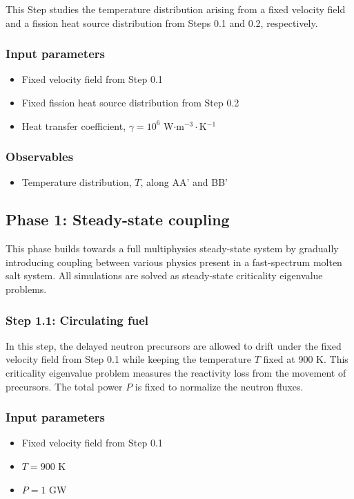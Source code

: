 This Step studies the temperature distribution arising from a fixed velocity
field and a fission heat source distribution from Steps 0.1 and 0.2,
respectively.

\subsubsection*{Input parameters}
\begin{itemize}
    \item Fixed velocity field from Step 0.1
    \item Fixed fission heat source distribution from Step 0.2
    \item Heat transfer coefficient, $\gamma = 10^6$ W$\cdot$m$^{-3}\cdot$K$^{-1}$
\end{itemize}
%
\subsubsection*{Observables}
\begin{itemize}
    \item Temperature distribution, $T$, along AA' and BB'
\end{itemize}

\subsection{Phase 1: Steady-state coupling}

This phase builds towards a full multiphysics steady-state system by gradually
introducing coupling between various physics present in
a fast-spectrum molten salt system. All simulations are solved as steady-state
criticality eigenvalue problems.

\subsubsection{Step 1.1: Circulating fuel}

In this step, the delayed neutron precursors are allowed to drift under the
fixed velocity field from Step 0.1 while keeping the temperature $T$ fixed at
900 K. This criticality eigenvalue problem measures the reactivity loss from
the movement of precursors. The total power $P$ is fixed to normalize the
neutron fluxes.

\subsubsection*{Input parameters}
\begin{itemize}
    \item Fixed velocity field from Step 0.1
    \item $T = 900$ K
    \item $P = 1$ GW
\end{itemize}
%

